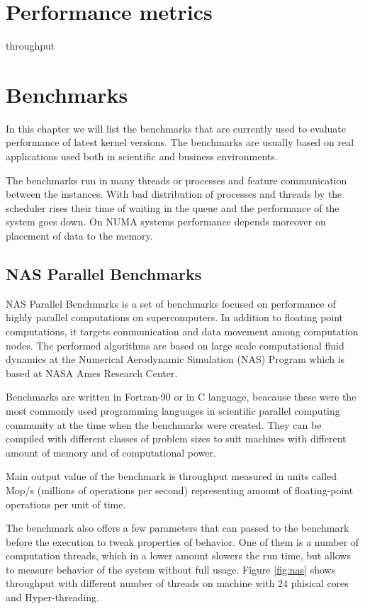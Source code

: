 \section{Performance metrics}
throughput

\section{Benchmarks}
In this chapter we will list the benchmarks that are currently used to evaluate
performance of latest kernel versions. The benchmarks are usually based on real
applications used both in scientific and business environments.

The benchmarks run in many threads or processes and feature communication
between the instances. With bad distribution of processes and threads by the
scheduler rises their time of waiting in the queue and the performance of the
system goes down. On NUMA systems performance depends moreover on placement of
data to the memory.

\subsection{NAS Parallel Benchmarks}
NAS Parallel Benchmarks is a set of benchmarks focused on performance of highly
parallel computations on supercomputers. In addition to floating point
computations, it targets communication and data movement among computation
nodes. The performed algorithms are based on large scale computational fluid
dynamics at the Numerical Aerodynamic Simulation (NAS) Program which is based at
NASA Ames Research Center.

Benchmarks are written in Fortran-90 or in C language, beacause these were the most
commonly used programming languages in scientific parallel computing community
at the time when the benchmarks were created. They can be compiled with different classes of
problem sizes to suit machines with different amount of memory and of computational
power.

Main output value of the benchmark is throughput measured in units called Mop/s
(millions of operations per second) representing amount of floating-point
operations per unit of time.

The benchmark also offers a few parameters that can passed to the benchmark
before the execution to tweak properties of behavior. One of them is a number of
computation threads, which in a lower amount slowers the run time, but allows to
measure behavior of the system without full usage. Figure \ref{fig:nas} shows
throughput with different number of threads on machine with 24 phisical cores
and Hyper-threading.

